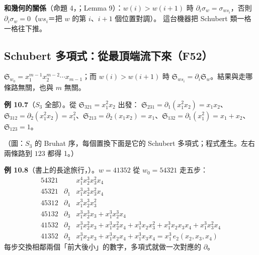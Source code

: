 \textbf{和幾何的關係}（命題 4，；Lemma 9）：$w(i)>w(i+1)$ 時 $\partial_i\sigma_w=\sigma_{ws_i}$，否則 $\partial_i\sigma_w=0$（$ws_i$＝把 $w$ 的第 $i$、$i+1$ 個位置對調）。
這台機器把 Schubert 類一格一格往下推。

\subsection{Schubert 多項式：從最頂端流下來（F52）}\label{sec:f-schubpoly}

\begin{thmbox}
$\mathfrak S_{w_0}=x_1^{m-1}x_2^{m-2}\cdots x_{m-1}$；而 $w(i)>w(i+1)$ 時 $\mathfrak S_{ws_i}=\partial_i\mathfrak S_w$。結果與走哪條路無關，也與 $m$ 無關。
\end{thmbox}

\textbf{例 10.7}（$S_3$ 全部）。從 $\mathfrak S_{321}=x_1^2x_2$ 出發：
$\mathfrak S_{231}=\partial_1(x_1^2x_2)=x_1x_2$、$\mathfrak S_{312}=\partial_2(x_1^2x_2)=x_1^2$、$\mathfrak S_{213}=\partial_2(x_1x_2)=x_1$、$\mathfrak S_{132}=\partial_1(x_1^2)=x_1+x_2$、$\mathfrak S_{123}=1$。
\begin{center}
\FulHasseSthree
\end{center}
（圖：$S_3$ 的 Bruhat 序，每個置換下面是它的 Schubert 多項式；程式產生。左右兩條路到 $123$ 都得 1。）

\textbf{例 10.8}（書上的長途旅行，）。$w=41352$ 從 $w_0=54321$ 走五步：
\[
\begin{array}{lll}
54321 & & x_1^4x_2^3x_3^2x_4\\
45321 & \partial_1 & x_1^3x_2^3x_3^2x_4\\
45312 & \partial_4 & x_1^3x_2^3x_3^2\\
45132 & \partial_3 & x_1^3x_2^3x_3+x_1^3x_2^3x_4\\
41532 & \partial_2 & x_1^3x_2^2x_3+x_1^3x_2^2x_4+x_1^3x_2x_3^2+x_1^3x_2x_3x_4+x_1^3x_3^2x_4\\
41352 & \partial_3 & x_1^3x_2x_3+x_1^3x_2x_4+x_1^3x_3x_4=x_1^3\,e_2(x_2,x_3,x_4)
\end{array}
\]
每步交換相鄰兩個「前大後小」的數字，多項式就做一次對應的 $\partial$。

\begin{table}[H]
\centering
\FulSchubertSfour
\caption{$S_4$ 的 24 個 Schubert 多項式（依長度排列；程式產生）。注意係數全是非負整數。}
\label{tab:f-schubert-s4}
\end{table}

